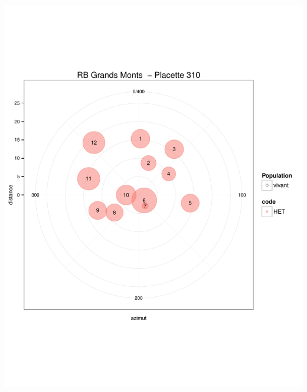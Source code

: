 \documentclass[a4paper]{book}\usepackage[]{graphicx}\usepackage[]{color}
\makeatletter
\def\maxwidth{ %
  \ifdim\Gin@nat@width>\linewidth
    \linewidth
  \else
    \Gin@nat@width
  \fi
}
\newenvironment{knitrout}{}{} %
\makeatother
\begin{document}
\begin{knitrout}
{\centering \includegraphics[width=\maxwidth]{Figures/PlanArbres-28} 

}





\end{knitrout}
\end{document}
